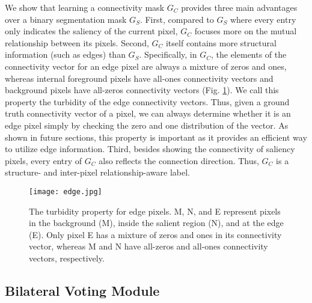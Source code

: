 \documentclass[final]{cvpr}
\begin{document}
We show that learning a connectivity mask $G_C$ provides three main advantages over a binary segmentation mask $G_S$. First, compared to $G_S$ where every entry only indicates the saliency of the current pixel, $G_C$ focuses more on the mutual relationship between its pixels. Second, $G_C$ itself contains more structural information (such as edges) than $G_S$. Specifically, in $G_C$, the elements of the connectivity vector for an edge pixel are always a mixture of zeros and ones, whereas internal foreground pixels have all-ones connectivity vectors and background pixels have all-zeros connectivity vectors (Fig. \ref{turbidity}). We call this property the turbidity of the edge connectivity vectors. Thus, given a ground truth connectivity vector of a pixel, we can always determine whether it is an edge pixel %
simply by checking the zero and one distribution of the vector. As shown in future sections, this property is important as it provides an efficient way to utilize edge information. %
Third, besides showing the connectivity of saliency pixels, every entry of $G_C$ also reflects the connection direction. Thus, $G_C$ is a structure- and inter-pixel relationship-aware label.

\begin{figure}[h!]
\begin{center}
\texttt{[image: edge.jpg]}
\end{center}
\vspace{-8pt}
   \caption{The turbidity property for edge pixels. M, N, and E represent pixels in the background (M), inside the salient region (N), and at the edge (E). Only pixel E has a mixture of zeros and ones in its connectivity vector, whereas M and N have all-zeros and all-ones connectivity vectors, respectively.}
   \vspace{-10pt}
\label{turbidity}
\end{figure}

\subsection{Bilateral Voting Module}
\end{document}
